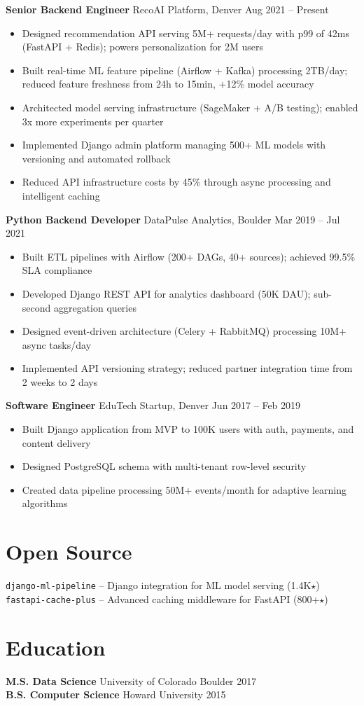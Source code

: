\documentclass[10pt,a4paper]{article}
\begin{document}
\textbf{Senior Backend Engineer} \enspace\textbar\enspace RecoAI Platform, Denver \hfill Aug 2021 -- Present
\begin{itemize}
  \item Designed recommendation API serving 5M+ requests/day with p99 of 42ms (FastAPI + Redis); powers personalization for 2M users
  \item Built real-time ML feature pipeline (Airflow + Kafka) processing 2TB/day; reduced feature freshness from 24h to 15min, +12\% model accuracy
  \item Architected model serving infrastructure (SageMaker + A/B testing); enabled 3x more experiments per quarter
  \item Implemented Django admin platform managing 500+ ML models with versioning and automated rollback
  \item Reduced API infrastructure costs by 45\% through async processing and intelligent caching
\end{itemize}

\textbf{Python Backend Developer} \enspace\textbar\enspace DataPulse Analytics, Boulder \hfill Mar 2019 -- Jul 2021
\begin{itemize}
  \item Built ETL pipelines with Airflow (200+ DAGs, 40+ sources); achieved 99.5\% SLA compliance
  \item Developed Django REST API for analytics dashboard (50K DAU); sub-second aggregation queries
  \item Designed event-driven architecture (Celery + RabbitMQ) processing 10M+ async tasks/day
  \item Implemented API versioning strategy; reduced partner integration time from 2 weeks to 2 days
\end{itemize}

\textbf{Software Engineer} \enspace\textbar\enspace EduTech Startup, Denver \hfill Jun 2017 -- Feb 2019
\begin{itemize}
  \item Built Django application from MVP to 100K users with auth, payments, and content delivery
  \item Designed PostgreSQL schema with multi-tenant row-level security
  \item Created data pipeline processing 50M+ events/month for adaptive learning algorithms
\end{itemize}

\section{Open Source}
\texttt{\color{accent}django-ml-pipeline} -- Django integration for ML model serving (1.4K$\star$)\\
\texttt{\color{accent}fastapi-cache-plus} -- Advanced caching middleware for FastAPI (800+$\star$)

\section{Education}
\textbf{M.S. Data Science} \hfill University of Colorado Boulder \hfill 2017\\
\textbf{B.S. Computer Science} \hfill Howard University \hfill 2015
\end{document}
